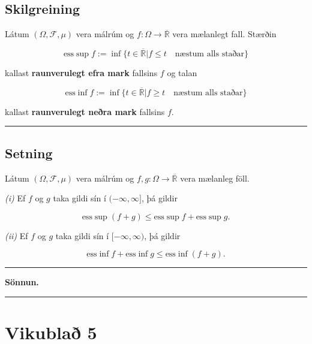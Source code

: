 \documentclass[]{book}
\begin{document}
\hypertarget{skilgreining-16}{%
\section{Skilgreining}\label{skilgreining-16}}

Látum \((\Omega, \mathcal F, \mu)\) vera málrúm og \(f: \Omega \rightarrow \overline{\mathbb R}\) vera mælanlegt fall. Stærðin

\[
\text{ess}\sup f := \inf\{t\in\overline{\mathbb R} | f\leq t \quad \text{næstum alls staðar}\}
\]

kallast \textbf{raunverulegt efra mark} fallsins \(f\) og talan

\[
\text{ess}\inf f := \inf\{t\in\overline{\mathbb R} | f\geq t \quad \text{næstum alls staðar}\}
\]

kallast \textbf{raunverulegt neðra mark} fallsins \(f\).

\begin{center}\rule{0.5\linewidth}{\linethickness}\end{center}

\hypertarget{setning-41}{%
\section{Setning}\label{setning-41}}

Látum \((\Omega, \mathcal F, \mu)\) vera málrúm og \(f,g:\Omega\rightarrow\overline{\mathbb R}\) vera mælanleg föll.

\emph{(i)} Ef \(f\) og \(g\) taka gildi sín í \((-\infty, \infty]\), þá gildir

\[
\text{ess}\sup(f+g) \leq \text{ess}\sup f + \text{ess}\sup g.
\]

\emph{(ii)} Ef \(f\) og \(g\) taka gildi sín í \([-\infty, \infty)\), þá gildir

\[
\text{ess}\inf f + \text{ess}\inf g \leq \text{ess}\inf(f+g).
\]

\begin{center}\rule{0.5\linewidth}{\linethickness}\end{center}

\textbf{Sönnun.}

\begin{center}\rule{0.5\linewidth}{\linethickness}\end{center}

\hypertarget{vikubla-5}{%
\chapter*{Vikublað 5}\label{vikubla-5}}
\end{document}
